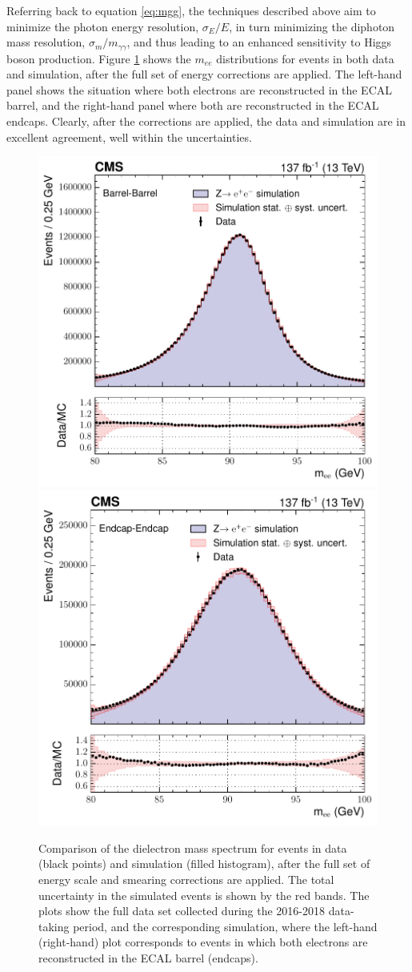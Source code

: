 Referring back to equation \ref{eq:mgg}, the techniques described above aim to minimize the photon energy resolution, $\sigma_E/E$, in turn minimizing the diphoton mass resolution, $\sigma_m/m_{\gamma\gamma}$, and thus leading to an enhanced sensitivity to Higgs boson production. Figure \ref{fig:photon_energy_0} shows the $m_{ee}$ distributions for \Zee events in both data and simulation, after the full set of energy corrections are applied. The left-hand panel shows the situation where both electrons are reconstructed in the ECAL barrel, and the right-hand panel where both are reconstructed in the ECAL endcaps. Clearly, after the corrections are applied, the data and simulation are in excellent agreement, well within the uncertainties.

\begin{figure}[hptb]
  \centering
  \includegraphics[width=.49\textwidth]{Figures/hgg_overview/money_run2_EbEb_inclusive.pdf}
  \includegraphics[width=.49\textwidth]{Figures/hgg_overview/money_run2_EeEe_inclusive.pdf}
  \caption[Dielectron mass spectrum for \Zee events in data and simulation after the energy corrections are applied]
  {
    Comparison of the dielectron mass spectrum for \Zee events in data (black points) and simulation (filled histogram), after the full set of energy scale and smearing corrections are applied. The total uncertainty in the simulated events is shown by the red bands. The plots show the full data set collected during the 2016-2018 data-taking period, and the corresponding simulation, where the left-hand (right-hand) plot corresponds to events in which both electrons are reconstructed in the ECAL barrel (endcaps).
  }
  \label{fig:photon_energy_0}
\end{figure}

